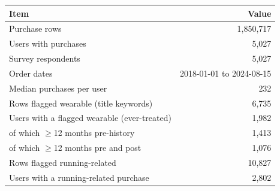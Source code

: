 \begin{tabular}{lr}\toprule
Item & Value \\\midrule
Purchase rows & 1,850,717 \\
Users with purchases & 5,027 \\
Survey respondents & 5,027 \\
Order dates & 2018-01-01 to 2024-08-15 \\
Median purchases per user & 232 \\
Rows flagged wearable (title keywords) & 6,735 \\
Users with a flagged wearable (ever-treated) & 1,982 \\
  of which $\geq$12 months pre-history & 1,413 \\
  of which $\geq$12 months pre and post & 1,076 \\
Rows flagged running-related & 10,827 \\
Users with a running-related purchase & 2,802 \\
\bottomrule\end{tabular}

